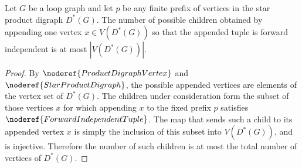 \begin{helper}
Let \(G\) be a loop graph and let \(p\) be any finite prefix of vertices in
the star product digraph \(D^*(G)\).  The number of possible children
obtained by appending one vertex \(x\in V(D^*(G))\) so that the appended
tuple is forward independent is at most \(|V(D^*(G))|\).
\end{helper}
\begin{proof}
By \(\noderef{ProductDigraphVertex}\) and \(\noderef{StarProductDigraph}\),
the possible appended vertices are elements of the vertex set of \(D^*(G)\).
The children under consideration form the subset of those vertices \(x\) for
which appending \(x\) to the fixed prefix \(p\) satisfies
\(\noderef{ForwardIndependentTuple}\).  The map that sends such a child to
its appended vertex \(x\) is simply the inclusion of this subset into
\(V(D^*(G))\), and is injective.  Therefore the number of such children is
at most the total number of vertices of \(D^*(G)\).
\end{proof}
